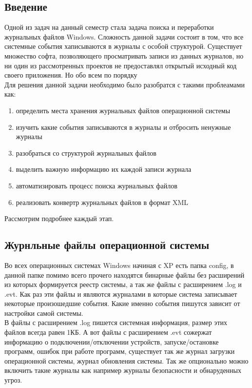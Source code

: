 \subsection{Введение}

Одной из задач на данный семестр стала задача поиска и переработки журнальных файлов Windows. Сложность данной задачи состоит в том, что все системные события хаписываются в журналы с особой структурой. Существует множество софта, позволяющего просматривать записи из данных журналов, но ни один из рассмотренных проектов не предоставлял открытый исходный код своего приложения. Но обо всем по порядку \\
Для решения данной задачи необходимо было разобратся с такими проблеамами как: 

\begin{enumerate}
\item определить места хранения журнальных файлов операционной системы
\item изучить какие события записываются в журналы и отбросить ненужные журналы
\item разобраться со структурой журнальных файлов
\item выделить важную информацию их каждой записи журнала
\item автоматизировать процесс поиска журнальных файлов
\item реализовать конвертр журнальных файлов в формат XML
\end{enumerate}

Рассмотрим подробнее каждый этап. \\

\subsection{Журнльные файлы операционной системы }

Во всех операционных системах Windows начиная с XP есть папка config, в данной папке помимо всего прочего находятся бинарные файлы без расширений из которых формируется реестр системы, а так же файлы с расширением .log и .evt. Как раз эти файлы и являются журналами в которые система записывает некоторые произошедшие события. Какие именно события пишутся зависит от настройки самой системы. \\

В файлы с расширением .log пишется системная информация, размер этих файлов всегда равен 1КБ. А вот файлы с расширением .evt сожержат информацию о подключении/отключении устройств, запуске/остановке программ, ошибок при работе программ, существует так же журнал загрузки операционной системы, журнал обновления системы. Так же опционально можно включить такие журналы как например журналы безопасности и обнаруденных угроз. \\

